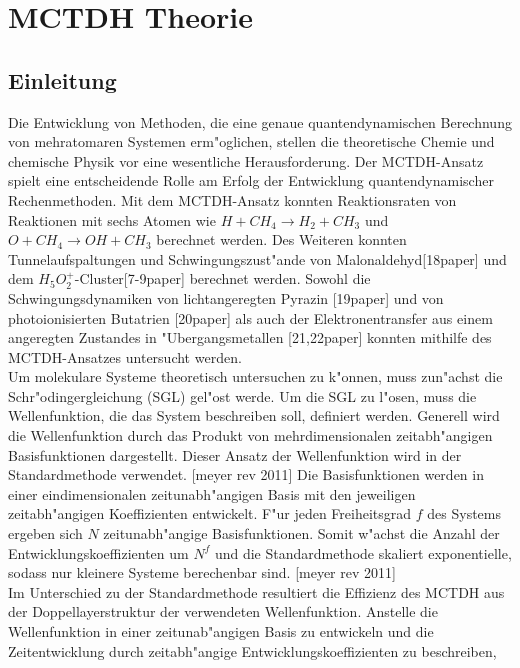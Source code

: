 \chapter{MCTDH Theorie}

\section{Einleitung}
Die Entwicklung von Methoden, die eine genaue quantendynamischen Berechnung von mehratomaren Systemen erm"oglichen, stellen die theoretische Chemie und
chemische Physik vor eine wesentliche Herausforderung.
Der MCTDH-Ansatz \cite{MMC, MMC1} spielt eine entscheidende Rolle am Erfolg der Entwicklung quantendynamischer Rechenmethoden.
Mit dem MCTDH-Ansatz konnten Reaktionsraten von Reaktionen mit sechs Atomen wie $H+CH_{4} \rightarrow H_{2} + CH_{3}$  \cite{HM1, HM2, HM4, WWM, WWM2}
und $ O + CH_{4} \rightarrow OH + CH_{3} $ \cite{HM5} berechnet werden.
Des Weiteren konnten Tunnelaufspaltungen und Schwingungszust"ande von Malonaldehyd[18paper] und dem $ H_{5}O^{+}_{2} $-Cluster[7-9paper] berechnet werden.
Sowohl die Schwingungsdynamiken von lichtangeregten Pyrazin [19paper] und von photoionisierten Butatrien [20paper] als auch der Elektronentransfer
aus einem angeregten Zustandes in "Ubergangsmetallen [21,22paper]  konnten mithilfe des MCTDH-Ansatzes untersucht werden.
\\Um molekulare Systeme theoretisch untersuchen zu k"onnen, muss zun"achst die Schr"odingergleichung (SGL) gel"ost werde.
Um die SGL zu l"osen, muss die Wellenfunktion, die das System beschreiben soll, definiert werden.
Generell wird die Wellenfunktion durch das Produkt von mehrdimensionalen zeitabh"angigen Basisfunktionen dargestellt.
Dieser Ansatz der Wellenfunktion wird in der Standardmethode verwendet. [meyer rev 2011]
 Die Basisfunktionen werden in einer eindimensionalen zeitunabh"angigen Basis mit den jeweiligen zeitabh"angigen Koeffizienten entwickelt.
F"ur jeden Freiheitsgrad $f$ des Systems ergeben sich $N$ zeitunabh"angige Basisfunktionen. Somit w"achst die Anzahl der Entwicklungskoeffizienten um $N^{f}$ und
die Standardmethode skaliert exponentielle, sodass nur kleinere Systeme berechenbar sind. [meyer rev 2011]
  \\ Im Unterschied zu der Standardmethode resultiert die Effizienz des MCTDH aus der Doppellayerstruktur der verwendeten Wellenfunktion.
Anstelle die Wellenfunktion in einer zeitunab"angigen Basis zu entwickeln und die Zeitentwicklung durch zeitabh"angige Entwicklungskoeffizienten zu beschreiben,
